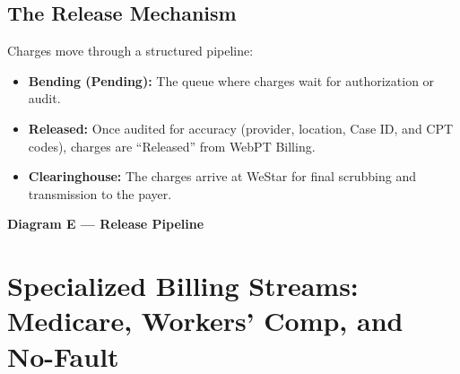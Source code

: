 \documentclass[11pt,a4paper]{article}
\begin{document}
\subsection{The Release Mechanism}

Charges move through a structured pipeline:

\begin{itemize}
  \item \textbf{Bending (Pending):} The queue where charges wait for authorization or audit.
  \item \textbf{Released:} Once audited for accuracy (provider, location, Case ID, and CPT codes), charges are ``Released'' from WebPT Billing.
  \item \textbf{Clearinghouse:} The charges arrive at WeStar for final scrubbing and transmission to the payer.
\end{itemize}

\vspace{0.4em}
\begin{center}
\textbf{\color{AccentTeal}Diagram E --- Release Pipeline}\\[0.5em]
\end{center}


\section{Specialized Billing Streams: Medicare, Workers' Comp, and No-Fault}
\end{document}
